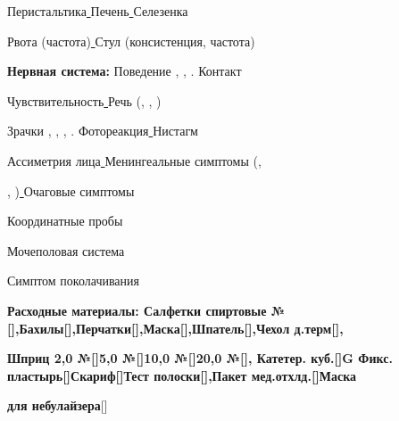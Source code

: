 \documentclass{medkarta}
\begin{document}
Перистальтика\uline{ \hfill}Печень\uline{ \hfill}Селезенка\uline{ \hfill}

Рвота (частота)\uline{ \hfill}Стул (консистенция, частота)\uline{ \hfill}

\textbf{Нервная система:} Поведение , , . Контакт\uline{ \hfill}

Чувствительность\uline{ \hfill}Речь (, , )\uline{ \hfill}

Зрачки , , , . Фотореакция\uline{ \hfill}Нистагм\uline{ \hfill}

Ассиметрия лица\uline{ \hfill}Менингеальные симптомы (,

, )\uline{ \hfill}Очаговые симптомы\uline{ \hfill}

Координатные пробы\uline{ \hfill}

Мочеполовая система\uline{ \hfill}

Симптом поколачивания\uline{ \hfill}

\begin{status}
\end{status}
\begin{data}
\end{data}
\begin{help}
\end{help}
\begin{recomend}
\end{recomend}
\begin{signal}
\end{signal}

\textbf{Расходные материалы: Салфетки спиртовые №[],Бахилы[],Перчатки[],Маска[],Шпатель[],Чехол д.терм[],}

\textbf{Шприц 2,0 №[]5,0 №[]10,0 №[]20,0 №[], Катетер. куб.[]G Фикс. пластырь[]Скариф[]Тест полоски[],Пакет мед.отхлд.[]Маска}

\textbf{для небулайзера}[]

\uline{ \hfill}
\end{document}
